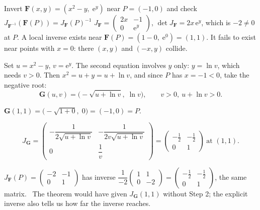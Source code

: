 \begin{worked}{Invert $\mathbf{F}(x,y)=(x^{2}-y,\;\mathrm{e}^{y})$ near $P=(-1,0)$ and check $J_{\mathbf{F}^{-1}}(\mathbf{F}(P))=J_{\mathbf{F}}(P)^{-1}$}
$J_{\mathbf{F}}=\begin{pmatrix}2x&-1\\0&\mathrm{e}^{y}\end{pmatrix}$,
$\det J_{\mathbf{F}}=2x\,\mathrm{e}^{y}$, which is $-2\neq0$ at $P$. A local
inverse exists near $\mathbf{F}(P)=(1-0,\;\mathrm{e}^{0})=(1,1)$. It fails
to exist near points with $x=0$: there $(x,y)$ and $(-x,y)$ collide.

Set $u=x^{2}-y$, $v=\mathrm{e}^{y}$. The second equation involves $y$ only:
$y=\ln v$, which needs $v>0$. Then $x^{2}=u+y=u+\ln v$, and since $P$ has
$x=-1<0$, take the negative root:
\[
  \mathbf{G}(u,v)=\bigl(-\sqrt{u+\ln v},\;\ln v\bigr),
  \qquad v>0,\ u+\ln v>0 .
\]

$\mathbf{G}(1,1)=\bigl(-\sqrt{1+0},\;0\bigr)=(-1,0)=P$. \checkmark

\[
  J_{\mathbf{G}}=\begin{pmatrix}
    -\dfrac{1}{2\sqrt{u+\ln v}}&-\dfrac{1}{2v\sqrt{u+\ln v}}\\[1.4ex]
    0&\dfrac1v\end{pmatrix}
  =\begin{pmatrix}-\tfrac12&-\tfrac12\\0&1\end{pmatrix}
  \ \text{at }(1,1).
\]

$J_{\mathbf{F}}(P)=\begin{pmatrix}-2&-1\\0&1\end{pmatrix}$ has inverse
$\dfrac{1}{-2}\begin{pmatrix}1&1\\0&-2\end{pmatrix}
=\begin{pmatrix}-\tfrac12&-\tfrac12\\0&1\end{pmatrix}$, the same matrix.
\checkmark\ The theorem would have given $J_{\mathbf{G}}(1,1)$ without
Step 2; the explicit inverse also tells us how far the inverse reaches.
\end{worked}

